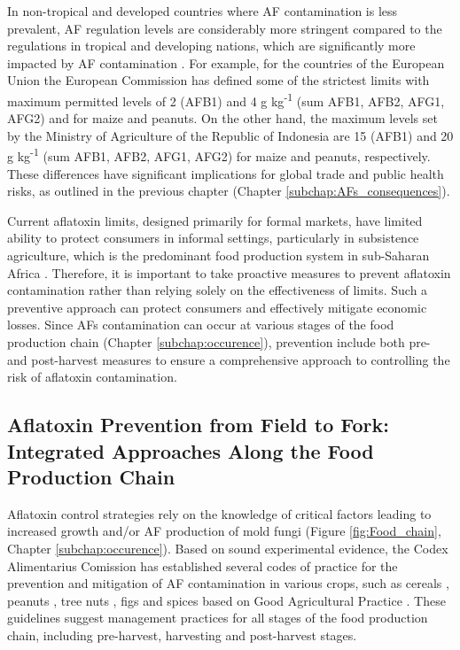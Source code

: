 In non-tropical and developed countries where AF contamination is less prevalent, AF regulation levels are considerably more stringent compared to the regulations in tropical and developing nations, which are significantly more impacted by AF contamination \citep{sirma2018impacts}. For example, for the countries of the European Union the European Commission has defined some of the strictest limits with maximum permitted levels of 2 (AFB1) and 4 \textmu{}g kg\textsuperscript{-1} (sum AFB1, AFB2, AFG1, AFG2) and for maize and peanuts. On the other hand, the maximum levels set by the Ministry of Agriculture of the Republic of Indonesia are 15 (AFB1) and 20 \textmu{}g kg\textsuperscript{-1} (sum AFB1, AFB2, AFG1, AFG2) for maize and peanuts, respectively. These differences have significant implications for global trade and public health risks, as outlined in the previous chapter (Chapter \ref{subchap:AFs_consequences}). 


Current aflatoxin limits, designed primarily for formal markets, have limited ability to protect consumers in informal settings, particularly in subsistence agriculture, which is the predominant food production system in sub-Saharan Africa \citep{nji2022aflatoxins}. Therefore, it is important to take proactive measures to prevent aflatoxin contamination rather than relying solely on the effectiveness of limits. Such a preventive approach can protect consumers and effectively mitigate economic losses. Since AFs contamination can occur at various stages of the food production chain (Chapter \ref{subchap:occurence}), prevention include both pre- and post-harvest measures to ensure a comprehensive approach to controlling the risk of aflatoxin contamination.


\subsection{Aflatoxin Prevention from Field to Fork: Integrated Approaches Along the Food Production Chain} \label{subchap:prevention}

Aflatoxin control strategies rely on the knowledge of critical factors leading to increased growth and/or AF production of mold fungi (Figure \ref{fig:Food_chain}, Chapter \ref{subchap:occurence}). Based on sound experimental evidence, the Codex Alimentarius Comission has established several codes of practice for the prevention and mitigation of AF contamination in various crops, such as cereals \citep{CAC2003}, peanuts \citep{CAC2004}, tree nuts \citep{CAC2010}, figs \citep{CAC2008} and spices \citep{CAC2017} based on Good Agricultural Practice \citep{fao2003development}. These guidelines suggest management practices for all stages of the food production chain, including pre-harvest, harvesting and post-harvest stages.


